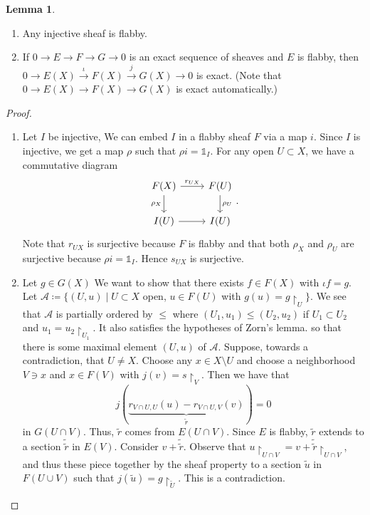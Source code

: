 \documentclass[10pt,letterpaper,cm]{nupset}
\theoremstyle{definition}
\theoremstyle{theorem}
\newtheorem{lemma}[definition]{Lemma}
\theoremstyle{remark}
\newcommand{\1}{\mathbb{1}}
\newcommand{\0}{\vec 0}
\begin{document}
\begin{lemma} $ $
\begin{enumerate}
\item Any injective sheaf is flabby. 
\item If $0 \to E \to F \to G \to 0$ is an exact sequence of sheaves and $E$ is flabby, then $0 \to E(X) \overset{\iota}{\longrightarrow} F(X) \overset{j}{\longrightarrow} G(X) \to 0$ is exact. (Note that $0 \to E(X) \to F(X) \to G(X)$ is exact automatically.)
\end{enumerate}
\end{lemma}
\begin{proof} $ $
\begin{enumerate}
\item Let $I$ be injective, We can embed $I$ in a flabby sheaf $F$ via a map $i$.  Since $I$ is injective, we get a map $\rho$ such that $\rho{i} = \1_I$.  For any open $U \subset X$, we have a commutative diagram
\[
\begin{tikzcd}
F(X) \arrow[r, "r_{UX}"] \arrow[d, "\rho_X"'] & F(U) \arrow[d, "\rho_U"] \\
I(U) \arrow[r]                                & I(U)                    
\end{tikzcd}
. \]
Note that $r_{UX}$ is surjective because $F$ is flabby and that both $\rho_X$ and $\rho_U$ are surjective because $\rho{i} = \1_I$. Hence $s_{UX}$ is surjective. 
\item Let $g \in G(X)$ We want to show that there exists $f\in F(X)$ with $\iota{f} =g$. Let $\mathcal{A} \coloneqq  \{(U, u) \mid U \subset X$ open, $u \in F(U)$ with $g(u) = g \restriction_U\}$. We see that $\mathcal{A}$ is partially ordered by $\leq$ where $(U_1, u_1) \leq (U_2, u_2)$ if $U_1 \subset U_2$ and $u_1 = u_2 \restriction_{U_1}$. It also satisfies the hypotheses of Zorn's lemma. so that there is some maximal element $(U,u)$ of $\mathcal{A}$. Suppose, towards a contradiction, that $U \ne X$. Choose any $x \in X \setminus U$ and choose a neighborhood $V \ni x$ and $x \in F(V)$ with $j(v) = s \restriction_V$. Then we have that $$  j(\underbrace{r_{V \cap U, U}(u) - r_{V \cap U, V}(v)}_{\tilde{r}}) =0  $$ in $G(U \cap V)$. Thus, $\tilde{r}$ comes from $E(U \cap V)$. Since $E$ is flabby, $\tilde{r}$ extends to a section $\tilde{\tilde{r}}$ in $E(V)$. Consider $v + \tilde{\tilde{r}}$. Observe that $u \restriction_{U \cap V} = v + \tilde{\tilde{r}}\restriction_{U \cap V}$, and thus these piece together by the sheaf property to a section $\tilde{u}$ in $F(U \cup V)$ such that $j(\tilde{u}) =g \restriction_{\tilde{U}}$. This is a contradiction. 
\end{enumerate}
\end{proof}
\end{document}
